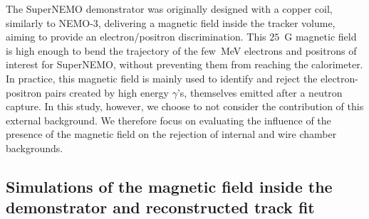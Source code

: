 The SuperNEMO demonstrator was originally designed with a copper coil, similarly to NEMO-$3$, delivering a magnetic field inside the tracker volume, aiming to provide an electron/positron discrimination.
This $25$~G magnetic field is high enough to bend the trajectory of the few~MeV electrons and positrons of interest for SuperNEMO, without preventing them from reaching the calorimeter.
In practice, this magnetic field is mainly used to identify and reject the electron-positron pairs created by high energy $\gamma$’s, themselves emitted after a neutron capture.
In this study, however, we choose to not consider the contribution of this external background.
We therefore focus on evaluating the influence of the presence of the magnetic field on the rejection of internal and wire chamber backgrounds.





\subsection{Simulations of the magnetic field inside the demonstrator and reconstructed track fit}

